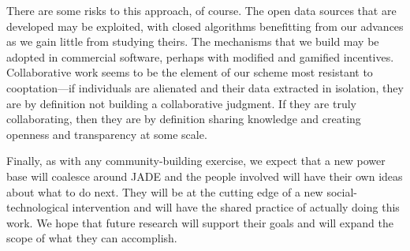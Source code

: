 \documentclass{sigchi-ext}
\begin{document}
There are some risks to this approach, of course.  The open data sources that are developed may be exploited, with closed algorithms benefitting from our advances as we gain little from studying theirs.  The mechanisms that we build may be adopted in commercial software, perhaps with modified and gamified incentives.  Collaborative work seems to be the element of our scheme most resistant to cooptation---if individuals are alienated and their data extracted in isolation, they are by definition not building a collaborative judgment.  If they are truly collaborating, then they are by definition sharing knowledge and creating openness and transparency at some scale.

Finally, as with any community-building exercise, we expect that a new power base will coalesce around JADE and the people involved will have their own ideas about what to do next.  They will be at the cutting edge of a new social-technological intervention and will have the shared practice of actually doing this work.  We hope that future research will support their goals and will expand the scope of what they can accomplish.

\balance{}



\end{document}
